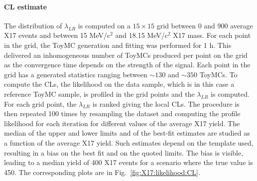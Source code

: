 \begin{refsection}
\paragraph{CL estimate}
The distribution of $\lambda_{LR}$ is computed on a $15 \times 15$ grid between 0 and 900 average X17 events and between 15 MeV/c$^2$ and 18.15 MeV/c$^2$ X17 mass. 
For each point in the grid, the ToyMC generation and fitting was performed for 1 h. 
This delivered an inhomogeneous number of ToyMCs produced per point on the grid as the convergence time depends on the strength of the signal. 
Each point in the grid has a generated statistics ranging between $\sim 130$ and $\sim 350$ ToyMCs. 
To compute the CLs, the likelihood on the data sample, which is in this case a reference ToyMC sample, is profiled in the grid points and the $\lambda_{LR}$ is computed. 
For each grid point, the $\lambda_{LR}$ is ranked giving the local CLs. 
The procedure is then repeated 100 times by resampling the dataset and computing the profile likelihood for each iteration for different values of the average X17 yield. 
The median of the upper and lower limits and of the best-fit estimates are studied as a function of the average X17 yield. 
Such estimates depend on the template used, resulting in a bias on the best fit and on the quoted limits. 
The bias is visible, leading to a median yield of 400 X17 events for a scenario where the true value is 450. 
The corresponding plots are in Fig.~\ref{fig:X17:likelihood:CL}.


\end{refsection}
